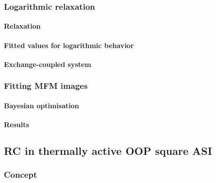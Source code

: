\subsubsection{Logarithmic relaxation}
\paragraph{Relaxation}
\paragraph{Fitted values for logarithmic behavior}
\paragraph{Exchange-coupled system} %
\subsubsection{Fitting MFM images}\label{sec:3:OOP:MFM}
\paragraph{Bayesian optimisation}
\paragraph{Results} %

\subsection{RC in thermally active OOP square ASI}
\subsubsection{Concept} %

